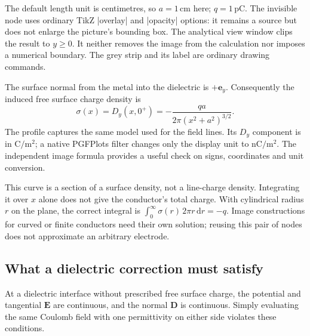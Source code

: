 The default length unit is centimetres, so $a=1\,\mathrm{cm}$ here;
$q=1\,\mathrm{pC}$. The invisible node uses ordinary TikZ |overlay| and
|opacity| options: it remains a source but does not enlarge the picture's
bounding box. The analytical view window clips the result to $y\geq0$.
It neither removes the image from the calculation nor imposes a numerical
boundary. The grey strip and its label are ordinary drawing commands.

The surface normal from the metal into the dielectric is $+\mathbf e_y$.
Consequently the induced free surface charge density is
\[
 \sigma(x)=D_y(x,0^+)=-\frac{qa}{2\pi(x^2+a^2)^{3/2}}.
\]
The profile captures the same model used for the field lines. Its $D_y$
component is in $\mathrm{C/m^2}$; a native PGFPlots filter changes only the
display unit to $\mathrm{nC/m^2}$. The independent image formula provides a
useful check on signs, coordinates and unit conversion.

\begin{codeexample}[width=0pt]
\end{codeexample}

This curve is a section of a surface density, not a line-charge density.
Integrating it over $x$ alone does not give the conductor's total charge.
With cylindrical radius $r$ on the plane, the correct integral is
$\int_0^\infty\sigma(r)\,2\pi r\,\mathrm dr=-q$.
Image constructions for curved or finite conductors need their own solution;
reusing this pair of nodes does not approximate an arbitrary electrode.

\subsection{What a dielectric correction must satisfy}
\label{sec:electric-correction}
At a dielectric interface without prescribed free surface charge, the
potential and tangential $\mathbf E$ are continuous, and the normal
$\mathbf D$ is continuous. Simply evaluating the same Coulomb field with
one permittivity on either side violates these conditions.

